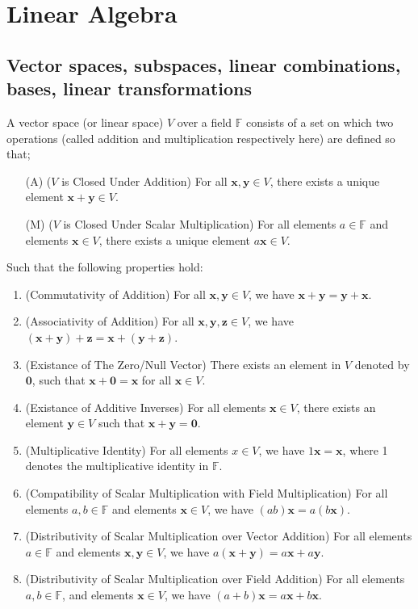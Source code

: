 \chapter{Linear Algebra}
\section{Vector spaces, subspaces, linear combinations, bases, linear transformations}
\begin{definition}{}{}
    A vector space (or linear space) \(V\) over a field \(\mathbb{F}\) consists of a set on which two operations (called addition and multiplication respectively here) are defined so that;
\begin{itemize}[label=(M1),leftmargin=*]
    \item[(A)](\(V\) is Closed Under Addition) For all \(\mathbf{x},\mathbf{y} \in V\), there exists a unique element \(\mathbf{x}+\mathbf{y} \in V\).
    \item[(M)](\(V\) is Closed Under Scalar Multiplication) For all elements \(a \in \mathbb{F}\) and elements \(\mathbf{x} \in V\), there exists a unique element \(a\mathbf{x} \in V\).
\end{itemize}
Such that the following properties hold:  
\begin{enumerate}[label=(VS {{\arabic*}}), leftmargin=*]
    \item \label{(VS 1)}(Commutativity of Addition) For all \(\mathbf{x},\mathbf{y} \in V\), we have \(\mathbf{x}+\mathbf{y}=\mathbf{y}+\mathbf{x}\).
    \item \label{(VS 2)}(Associativity of Addition) For all \(\mathbf{x},\mathbf{y},\mathbf{z} \in V\), we have \((\mathbf{x}+\mathbf{y})+\mathbf{z}=\mathbf{x}+(\mathbf{y}+\mathbf{z})\).
    \item \label{(VS 3)}(Existance of The Zero/Null Vector) There exists an element in \(V\) denoted by \({\mathbf{0}}\), such that \(\mathbf{x}+{\mathbf{0}}=\mathbf{x}\) for all \(\mathbf{x} \in V\).
    \item \label{(VS 4)}(Existance of Additive Inverses) For all elements \(\mathbf{x} \in V\), there exists an element \(\mathbf{y} \in V\) such that \(\mathbf{x}+\mathbf{y}={\mathbf{0}}\).
    \item \label{(VS 5)}(Multiplicative Identity) For all elements \(x \in V\), we have \(1\mathbf{x}=\mathbf{x}\), where 1 denotes the multiplicative identity in \(\mathbb{F}\).
    \item \label{(VS 6)}(Compatibility of Scalar Multiplication with Field Multiplication) For all elements \(a,b \in \mathbb{F}\) and elements \(\mathbf{x} \in V\), we have \((ab)\mathbf{x}=a(b\mathbf{x})\).
    \item \label{(VS 7)}(Distributivity of Scalar Multiplication over Vector Addition) For all elements \(a \in \mathbb{F}\) and elements \(\mathbf{x},\mathbf{y} \in V\), we have \(a(\mathbf{x}+\mathbf{y})=a\mathbf{x}+a\mathbf{y}\).
    \item \label{(VS 8)}(Distributivity of Scalar Multiplication over Field Addition) For all elements \(a,b \in \mathbb{F}\), and elements \(\mathbf{x} \in V\), we have \((a+b)\mathbf{x}=a\mathbf{x}+b\mathbf{x}\).
\end{enumerate}
\end{definition}
